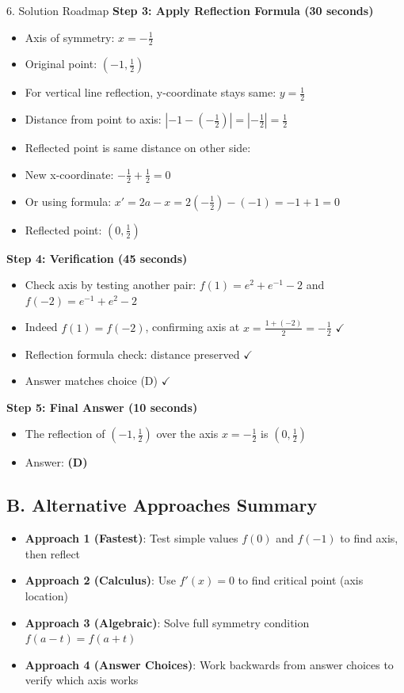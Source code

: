 \documentclass[12pt]{article}
\begin{document}
\begin{roadmapbox}{6. Solution Roadmap}
\textbf{Step 3: Apply Reflection Formula (30 seconds)}
\begin{itemize}
    \item Axis of symmetry: $x = -\frac{1}{2}$
    \item Original point: $(-1, \frac{1}{2})$
    \item For vertical line reflection, y-coordinate stays same: $y = \frac{1}{2}$
    \item Distance from point to axis: $|-1 - (-\frac{1}{2})| = |-\frac{1}{2}| = \frac{1}{2}$
    \item Reflected point is same distance on other side:
    \item New x-coordinate: $-\frac{1}{2} + \frac{1}{2} = 0$
    \item Or using formula: $x' = 2a - x = 2(-\frac{1}{2}) - (-1) = -1 + 1 = 0$
    \item Reflected point: $(0, \frac{1}{2})$
\end{itemize}

\textbf{Step 4: Verification (45 seconds)}
\begin{itemize}
    \item Check axis by testing another pair: $f(1) = e^2 + e^{-1} - 2$ and $f(-2) = e^{-1} + e^2 - 2$
    \item Indeed $f(1) = f(-2)$, confirming axis at $x = \frac{1 + (-2)}{2} = -\frac{1}{2}$ $\checkmark$
    \item Reflection formula check: distance preserved $\checkmark$
    \item Answer matches choice (D) $\checkmark$
\end{itemize}

\textbf{Step 5: Final Answer (10 seconds)}
\begin{itemize}
    \item The reflection of $(-1, \frac{1}{2})$ over the axis $x = -\frac{1}{2}$ is $(0, \frac{1}{2})$
    \item Answer: \textbf{(D)}
\end{itemize}

\subsection*{B. Alternative Approaches Summary}
\begin{itemize}[leftmargin=*]
    \item \textbf{Approach 1 (Fastest)}: Test simple values $f(0)$ and $f(-1)$ to find axis, then reflect
    \item \textbf{Approach 2 (Calculus)}: Use $f'(x) = 0$ to find critical point (axis location)
    \item \textbf{Approach 3 (Algebraic)}: Solve full symmetry condition $f(a-t) = f(a+t)$
    \item \textbf{Approach 4 (Answer Choices)}: Work backwards from answer choices to verify which axis works
\end{itemize}


\end{roadmapbox}
\end{document}
